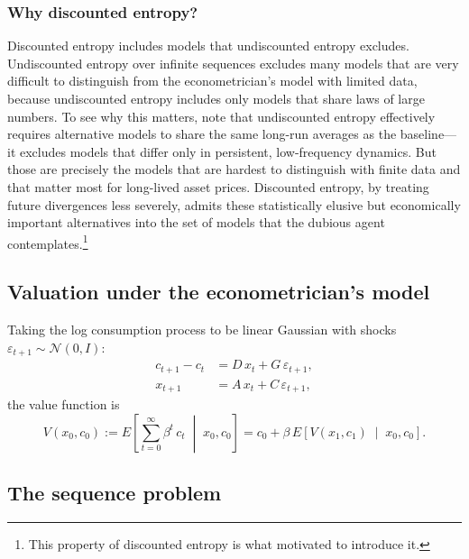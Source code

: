 \documentclass[12pt]{article}
\theoremstyle{definition}
\begin{document}
\subsubsection{Why discounted entropy?}

Discounted entropy includes models that undiscounted entropy excludes.
Undiscounted entropy over infinite sequences excludes many models that
are very difficult to distinguish from the econometrician's model with
limited data, because undiscounted entropy includes only models that
share laws of large numbers.
To see why this matters, note that undiscounted entropy effectively
requires alternative models to share the same long-run averages as the
baseline---it excludes models that differ only in persistent,
low-frequency dynamics.
But those are precisely the models that are hardest to distinguish with
finite data and that matter most for long-lived asset prices.
Discounted entropy, by treating future divergences less severely, admits
these statistically elusive but economically important alternatives into
the set of models that the dubious agent contemplates.\footnote{This property of
 discounted entropy 
is what motivated \citet{hansen1995discounted} to introduce it.}

\subsection{Valuation under the econometrician's model}

Taking the log consumption process to be linear Gaussian with shocks
$\varepsilon_{t+1} \sim {\mathcal N}(0,I)$:
\begin{align}
c_{t+1} - c_t &= D\, x_t + G\, \varepsilon_{t+1}, \label{eq:cons}\\
x_{t+1} &= A\, x_t + C\, \varepsilon_{t+1}, \label{eq:state2}
\end{align}
the value function is
\[
   V(x_0, c_0) := E\!\left[\sum_{t=0}^{\infty} \beta^t\, c_t
       \;\middle|\; x_0, c_0\right]
   = c_0 + \beta\, E\!\left[V(x_1, c_1)
       \;\middle|\; x_0, c_0\right].
\]

\subsection{The sequence problem}
\end{document}
